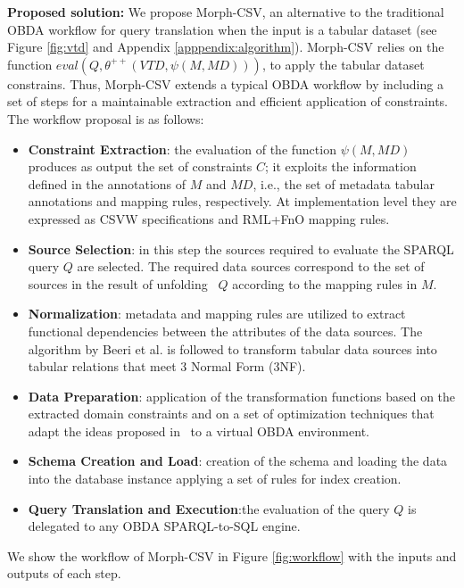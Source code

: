\noindent\textbf{Proposed solution:} We propose Morph-CSV, an alternative to the traditional OBDA workflow for query translation when the input is a tabular dataset (see Figure \ref{fig:vtd} and Appendix \ref{apppendix:algorithm}). Morph-CSV relies on the function $eval(Q,\theta^{++}(VTD,\psi(M,MD)))$, to apply the tabular dataset constrains. Thus, Morph-CSV extends a typical OBDA workflow by including a set of steps for a maintainable extraction and efficient application of constraints. The workflow proposal is as follows:
\begin{itemize}
    \item \textbf{Constraint Extraction}: the evaluation of the function $\psi(M,MD)$ produces as output the set of constraints $C$; it exploits the information defined in the annotations of $M$ and $MD$, i.e., the set of metadata tabular annotations and mapping rules, respectively. At implementation level they are expressed as CSVW specifications and RML+FnO mapping rules. 
    \item \textbf{Source Selection}: in this step the sources required to evaluate the SPARQL query $Q$ are selected. The required data sources correspond to the set of sources in the result of unfolding~\citep{poggi2008linking} $Q$ according to the mapping rules in $M$. 
    \item \textbf{Normalization}: metadata and mapping rules are utilized to extract functional dependencies between the attributes of the data sources. The algorithm by Beeri et al. \citep{Beeri1978ASI} is followed to transform tabular data sources into tabular relations that meet 3 Normal Form (3NF).  
    \item \textbf{Data Preparation}: application of the transformation functions based on the extracted domain constraints and on a set of optimization techniques that adapt the ideas proposed in~\citep{jozashoori2019mapsdi} to a virtual OBDA environment. 
    \item \textbf{Schema Creation and Load}: creation of the schema and loading the data into the database instance applying a set of rules for index creation. 
    \item \textbf{Query Translation and Execution}:the evaluation of the query $Q$ is delegated to any OBDA SPARQL-to-SQL engine.
\end{itemize}
 We show the workflow of Morph-CSV in Figure \ref{fig:workflow} with the inputs and outputs of each step. 

